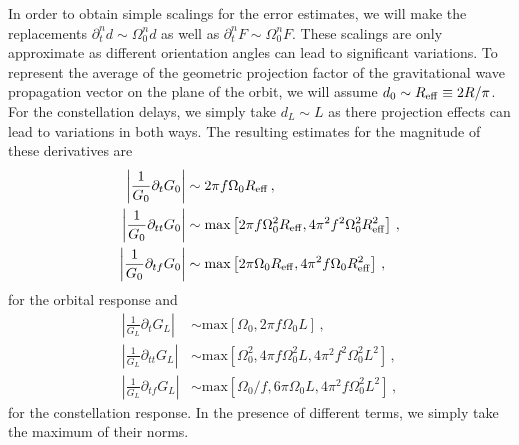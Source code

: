 \documentclass[aps,showpacs,twocolumn,
prd,superscriptaddress,nofootinbib]{revtex4-1}
\begin{document}
In order to obtain simple scalings for the error estimates, we will make the replacements $\partial_{t}^{n} d \sim \Omega_{0}^{n} d$ as well as $\partial_{t}^{n} F \sim \Omega_{0}^{n} F$. These scalings are only approximate as different orientation angles can lead to significant variations. To represent the average of the geometric projection factor of the gravitational wave propagation vector on the plane of the orbit, we will assume $d_{0} \sim R_{\rm eff} \equiv 2R/\pi $. For the constellation delays, we simply take $d_{L} \sim L$ as there projection effects can lead to variations in both ways. The resulting estimates for the magnitude of these derivatives are
\begin{subequations}\label{eq:estimatederivorb}
\begin{align}
	\left| \frac{1}{G_{0}} \partial_{t} G_{0} \right| &\sim 2 \pi f \Omega_{0} R_{\rm eff}\,,\\
	\left| \frac{1}{G_{0}} \partial_{tt} G_{0} \right| &\sim \text{max} \left[ 2 \pi f \Omega_{0}^{2} R_{\rm eff} , 4\pi^{2} f^{2} \Omega_{0}^{2} R_{\rm eff}^{2}\right] \,,\\
	\left| \frac{1}{G_{0}} \partial_{tf} G_{0} \right| &\sim \text{max} \left[ 2 \pi  \Omega_{0} R_{\rm eff}, 4 \pi^{2} f \Omega_{0} R_{\rm eff}^{2} \right] \,,
\end{align}
\end{subequations}
for the orbital response and
\begin{subequations}\label{eq:estimatederivconst}
\begin{align}
	\left| \frac{1}{G_{L}} \partial_{t} G_{L} \right| &\sim \text{max} \left[ \Omega_{0}, 2 \pi f \Omega_{0} L \right] \,,\\
	\left| \frac{1}{G_{L}} \partial_{tt} G_{L} \right| &\sim \text{max} \left[ \Omega_{0}^{2}, 4 \pi f \Omega_{0}^{2} L, 4\pi^{2} f^{2} \Omega_{0}^{2} L^{2} \right] \,,\\
	\left| \frac{1}{G_{L}} \partial_{tf} G_{L} \right| &\sim \text{max} \left[ \Omega_{0}/f, 6 \pi \Omega_{0} L, 4\pi^{2} f \Omega_{0}^{2} L^{2} \right] \,,
\end{align}
\end{subequations}
for the constellation response. In the presence of different terms, we simply take the maximum of their norms.
\end{document}
